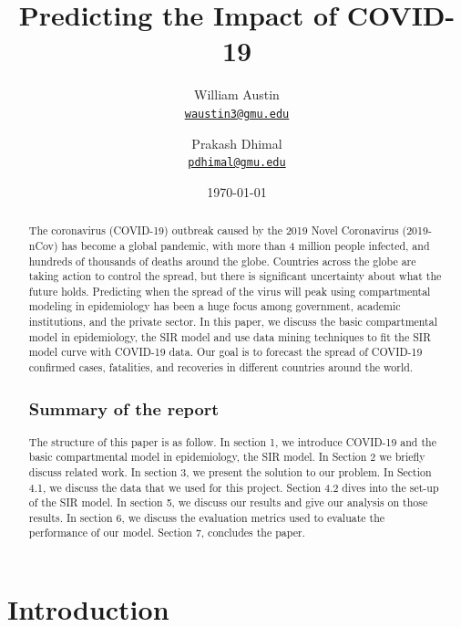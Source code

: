 \documentclass[11pt]{article}
\title{Predicting the Impact of COVID-19
}
\author{William Austin\\%
    \href{mailto:waustin3@gmu.edu}{\texttt{waustin3@gmu.edu}} %
\and Prakash Dhimal\\%
    \href{mailto:pdhimal@gmu.edu}{\texttt{pdhimal@gmu.edu}} %
    }
\date{\today}
\begin{document}
\maketitle
\begin{abstract}

The coronavirus (COVID-19) outbreak caused by the 2019 Novel Coronavirus (2019-nCov) has become a global pandemic, with more than 4 million people infected, and hundreds of thousands of deaths around the globe. Countries across the globe are taking action to control the spread, but there is significant uncertainty about what the future holds. Predicting when the spread of the virus will peak using compartmental modeling in epidemiology has been a huge focus among government, academic institutions, and the private sector. In this paper, we discuss the basic compartmental model in epidemiology, the SIR model and use data mining techniques to fit the SIR model curve with COVID-19 data. Our goal is to forecast the spread of COVID-19 confirmed cases, fatalities, and recoveries in different countries around the world.

\subsection{Summary of the report}

The structure of this paper is as follow. In section 1, we introduce COVID-19 and the basic compartmental model in epidemiology, the SIR model. In Section 2 we briefly discuss related work. In section 3, we present the solution to our problem. In Section 4.1, we discuss the data that we used for this project. Section 4.2 dives into the set-up of the SIR model. In section 5, we discuss our results and give our analysis on those results. In section 6, we discuss the evaluation metrics used to evaluate the performance of our model. Section 7, concludes the paper.
\end{abstract}

\section{Introduction}
\end{document}
